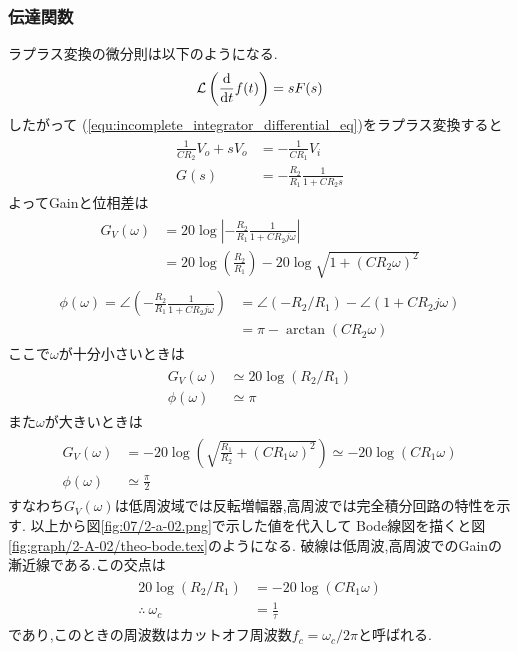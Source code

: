 \subsubsection{伝達関数}
ラプラス変換の微分則は以下のようになる.
\begin{align}
  \mathcal{L}\left(\frac{\rm d}{{\rm d}t}f(t)\right)=sF(s)
\end{align}
したがって
(\ref{equ:incomplete_integrator_differential_eq})をラプラス変換すると
\begin{align}
  \begin{split}
    \frac{1}{CR_2}V_o+sV_o&=-\frac{1}{CR_1}V_i\\
    G(s)&=-\frac{R_2}{R_1}\frac{1}{1+CR_2s}
  \end{split}
\end{align}
よってGainと位相差は
\begin{align}
  \begin{split}
    G_V(\omega)&=20\log\left|-\frac{R_2}{R_1}\frac{1}{1+CR_2j\omega}\right|\\
    &=20\log\left(\frac{R_2}{R_1}\right)-20\log\sqrt{1+(CR_2\omega)^2}
  \end{split}
\end{align}
\begin{align}
  \begin{split}
    \phi(\omega)=\angle\left(-\frac{R_2}{R_1}\frac{1}{1+CR_2j\omega}\right)
    &=\angle(-R_2/R_1)-\angle(1+CR_2j\omega)\\
    &=\pi-\arctan(CR_2\omega)
  \end{split}
\end{align}
ここで$\omega$が十分小さいときは
\begin{align}
  \begin{split}
    G_V(\omega)&\simeq20\log(R_2/R_1)\\
    \phi(\omega)&\simeq\pi
  \end{split}
\end{align}
また$\omega$が大きいときは
\begin{align}
  \begin{split}
    G_V(\omega)&=-20\log\left(\sqrt{\frac{R_1}{R_2}+(CR_1\omega)^2}\right)\simeq-20\log(CR_1\omega)\\
    \phi(\omega)&\simeq\frac{\pi}{2}
  \end{split}
\end{align}
すなわち$G_V(\omega)$は低周波域では反転増幅器,高周波では完全積分回路の特性を示す.
以上から図\ref{fig:07/2-a-02.png}で示した値を代入して
Bode線図を描くと図\ref{fig:graph/2-A-02/theo-bode.tex}のようになる.
破線は低周波,高周波でのGainの漸近線である.この交点は
\begin{align}
  \begin{split}
    20\log(R_2/R_1)&=-20\log(CR_1\omega)\\
    \therefore\ \omega_c&=\frac{1}{\tau}
  \end{split}
\end{align}
であり,このときの周波数はカットオフ周波数$f_c=\omega_c/2\pi$と呼ばれる.

